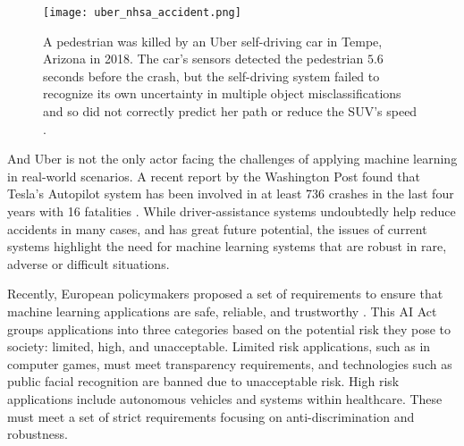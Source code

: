 \begin{figure}[t]
    \centering
    \texttt{[image: uber\_nhsa\_accident.png]}
    \caption{A pedestrian was killed by an Uber self-driving car in Tempe, Arizona in 2018. The car's sensors detected the pedestrian $5.6$ seconds before the crash, but the self-driving system failed to recognize its own uncertainty in multiple object misclassifications and so did not correctly predict her path or reduce the SUV's speed \cite[photo credit]{nationaltransportationsafetyboardnhsa_collision_2019}.}
    \label{fig:uber_nhsa_accident}
\end{figure}

And Uber is not the only actor facing the challenges of applying machine learning in real-world scenarios. A recent report by the Washington Post found that Tesla's Autopilot system has been involved in at least 736 crashes in the last four years with 16 fatalities \cite{siddiqui_17_2023}. 
While driver-assistance systems undoubtedly help reduce accidents in many cases, and has great future potential, the issues of current systems highlight the need for machine learning systems that are robust in rare, adverse or difficult situations. 

Recently, European policymakers proposed a set of requirements to ensure that machine learning applications are safe, reliable, and trustworthy \cite{europeancommission_briefing_2021}. 
This AI Act groups applications into three categories based on the potential risk they pose to society: limited, high, and unacceptable. Limited risk applications, such as in computer games, must meet transparency requirements, and technologies such as public facial recognition are banned due to unacceptable risk. 
High risk applications include autonomous vehicles and systems within healthcare. These must meet a set of strict requirements focusing on anti-discrimination and robustness.

